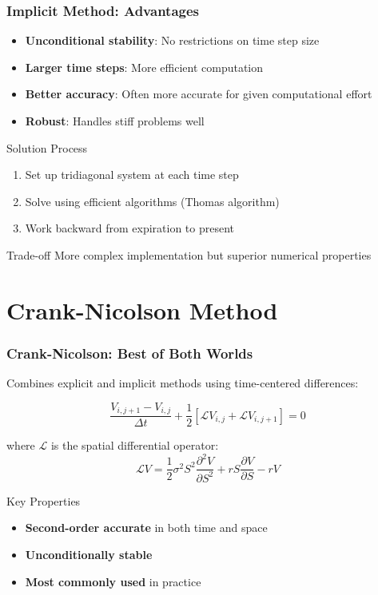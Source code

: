 \documentclass{beamer}
\begin{document}
\begin{frame}
\frametitle{Implicit Method: Advantages}
\begin{itemize}
\item \textbf{Unconditional stability}: No restrictions on time step size
\item \textbf{Larger time steps}: More efficient computation
\item \textbf{Better accuracy}: Often more accurate for given computational effort
\item \textbf{Robust}: Handles stiff problems well
\end{itemize}

\begin{block}{Solution Process}
\begin{enumerate}
\item Set up tridiagonal system at each time step
\item Solve using efficient algorithms (Thomas algorithm)
\item Work backward from expiration to present
\end{enumerate}
\end{block}

\begin{block}{Trade-off}
More complex implementation but superior numerical properties
\end{block}
\end{frame}

\section{Crank-Nicolson Method}

\begin{frame}
\frametitle{Crank-Nicolson: Best of Both Worlds}
Combines explicit and implicit methods using time-centered differences:

$$\frac{V_{i,j+1} - V_{i,j}}{\Delta t} + \frac{1}{2}\left[ \mathcal{L}V_{i,j} + \mathcal{L}V_{i,j+1} \right] = 0$$

where $\mathcal{L}$ is the spatial differential operator:
$$\mathcal{L}V = \frac{1}{2}\sigma^2 S^2 \frac{\partial^2 V}{\partial S^2} + rS \frac{\partial V}{\partial S} - rV$$

\begin{block}{Key Properties}
\begin{itemize}
\item \textbf{Second-order accurate} in both time and space
\item \textbf{Unconditionally stable}
\item \textbf{Most commonly used} in practice
\end{itemize}
\end{block}
\end{frame}
\end{document}
